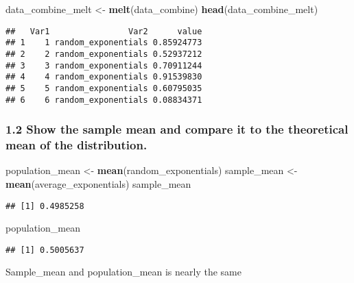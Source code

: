\documentclass[]{article}
\newenvironment{Shaded}{\begin{snugshade}}{\end{snugshade}}
\newcommand{\KeywordTok}[1]{\textcolor[rgb]{0.13,0.29,0.53}{\textbf{#1}}}
\newcommand{\DataTypeTok}[1]{\textcolor[rgb]{0.13,0.29,0.53}{#1}}
\newcommand{\StringTok}[1]{\textcolor[rgb]{0.31,0.60,0.02}{#1}}
\newcommand{\OperatorTok}[1]{\textcolor[rgb]{0.81,0.36,0.00}{\textbf{#1}}}
\newcommand{\NormalTok}[1]{#1}
\begin{document}
\begin{Shaded}
\begin{Highlighting}[]
\NormalTok{data_combine_melt <-}\StringTok{ }\KeywordTok{melt}\NormalTok{(data_combine)}
\KeywordTok{head}\NormalTok{(data_combine_melt)}
\end{Highlighting}
\end{Shaded}

\begin{verbatim}
##   Var1                Var2      value
## 1    1 random_exponentials 0.85924773
## 2    2 random_exponentials 0.52937212
## 3    3 random_exponentials 0.70911244
## 4    4 random_exponentials 0.91539830
## 5    5 random_exponentials 0.60795035
## 6    6 random_exponentials 0.08834371
\end{verbatim}

\subsubsection{1.2 Show the sample mean and compare it to the
theoretical mean of the
distribution.}\label{show-the-sample-mean-and-compare-it-to-the-theoretical-mean-of-the-distribution.}

\begin{Shaded}
\begin{Highlighting}[]
\NormalTok{population_mean <-}\StringTok{ }\KeywordTok{mean}\NormalTok{(random_exponentials)}
\NormalTok{sample_mean <-}\StringTok{ }\KeywordTok{mean}\NormalTok{(average_exponentials)}
\NormalTok{sample_mean}
\end{Highlighting}
\end{Shaded}

\begin{verbatim}
## [1] 0.4985258
\end{verbatim}

\begin{Shaded}
\begin{Highlighting}[]
\NormalTok{population_mean}
\end{Highlighting}
\end{Shaded}

\begin{verbatim}
## [1] 0.5005637
\end{verbatim}

Sample\_mean and population\_mean is nearly the same

\begin{Shaded}
\end{Shaded}
\end{document}
